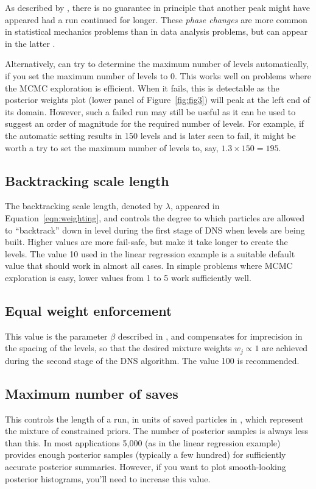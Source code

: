 \documentclass[article]{jss}
\begin{document}
As described by \citet{skilling2006nested}, there is no guarantee in principle that
another peak might have appeared had a run continued for longer. These
{\em phase changes} are more common in statistical mechanics problems than
in data analysis problems, but can appear in the latter
\citep[e.g.,][]{brewer2014inference, brewer2015fast}.

Alternatively,  can try to determine the maximum number of levels
automatically, if you set the maximum number of levels to 0. This works well
on problems where the MCMC exploration is efficient. When it fails, this
is detectable as the posterior weights plot (lower panel of
Figure~\ref{fig:fig3}) will peak at the left end of its domain. However,
such a failed run may still be useful as it can be used to suggest an order of
magnitude for the required number of levels. For example, if the automatic
setting results in 150 levels and is later seen to fail, it might be worth
a try to set the maximum number of levels to, say, $1.3 \times 150 = 195$.

\subsection{Backtracking scale length}
The backtracking scale length, denoted by $\lambda$, appeared in
Equation~\ref{eqn:weighting}, and controls the degree to which particles
are allowed to ``backtrack'' down in level during the first stage of DNS
when levels are being built. Higher values are more fail-safe, but
make it take longer to create the levels. The value 10 used in the linear
regression example is a suitable default value that should work in almost all
cases. In simple problems where MCMC exploration is easy, lower values
from 1 to 5 work sufficiently well.

\subsection{Equal weight enforcement}
This value is the parameter $\beta$ described in
\citet{brewer2011diffusive}, and compensates
for imprecision in the spacing of the levels, so that the desired mixture
weights $w_j \propto 1$ are achieved during the second stage of the DNS
algorithm. The value 100 is recommended.

\subsection{Maximum number of saves}
This controls the length of a  run, in units of saved particles
in , which represent the mixture of constrained priors.
The number of posterior samples is always less than this. In most applications
5,000 (as in the linear regression example) provides enough posterior
samples (typically a few hundred) for sufficiently accurate posterior
summaries. However, if you want to plot smooth-looking posterior histograms,
you'll need to increase this value.
\end{document}

